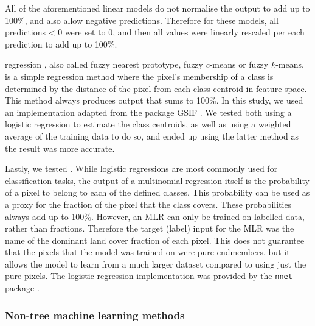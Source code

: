 \documentclass[review,authoryear,3p]{elsarticle}
\begin{document}
All of the aforementioned linear models do not normalise the output to add up to 100\%, and also allow negative predictions.
Therefore for these models, all predictions < 0 were set to 0, and then all values were linearly rescaled per each prediction to add up to 100\%.


 regression \citep{keller_fuzzy_1985}, also called fuzzy nearest prototype, fuzzy $c$-means or fuzzy $k$-means, is a simple regression method where the pixel's membership of a class is determined by the distance of the pixel from each class centroid in feature space.
This method always produces output that sums to 100\%.
In this study, we used an implementation adapted from the package GSIF \citep{hengl2004fuzzycmeans}.
We tested both using a logistic regression to estimate the class centroids, as well as using a weighted average of the training data to do so, and ended up using the latter method as the result was more accurate.


Lastly, we tested  \citep{theil_multinomial_1969}.
While logistic regressions are most commonly used for classification tasks, the output of a multinomial regression itself is the probability of a pixel to belong to each of the defined classes.
This probability can be used as a proxy for the fraction of the pixel that the class covers.
These probabilities always add up to 100\%.
However, an \ac{MLR} can only be trained on labelled data, rather than fractions.
Therefore the target (label) input for the \ac{MLR} was the name of the dominant land cover fraction of each pixel.
This does not guarantee that the pixels that the model was trained on were pure endmembers, but it allows the model to learn from a much larger dataset compared to using just the pure pixels.
The logistic regression implementation was provided by the \texttt{nnet} package \citep{nnet}.

\subsubsection{Non-tree machine learning methods}
\end{document}
